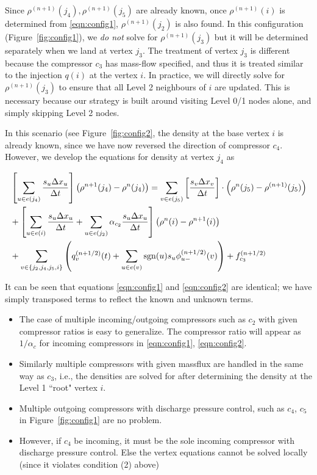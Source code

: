 \documentclass{amsart}
\DeclareMathOperator{\sgn}{sgn}
\begin{document}
Since $\rho^{(n+1)}(j_4), \rho^{(n+1)}(j_5)$ are already known, once $\rho^{(n+1)}(i)$ is determined from \eqref{eqn:config1}, $\rho^{(n+1)}(j_2)$ is also found. 
In this configuration (Figure~\ref{fig:config1}), we \emph{do not} solve for $\rho^{(n+1)}(j_3)$ but it will be determined separately when we land at vertex $j_3$. The treatment of vertex $j_3$ is different because the compressor $c_3$ has mass-flow specified, and thus it is treated similar to the injection $q(i)$  at the vertex $i$. In practice, we will directly solve for $\rho^{(n+1)}(j_3)$ to ensure that all Level 2 neighbours of $i$ are updated. This is necessary because our strategy is built around visiting  Level 0/1 nodes alone, and simply skipping Level 2 nodes.



In this scenario (see Figure~\ref{fig:config2}, the density at the base vertex $i$ is already known, since we have now reversed the direction of compressor $c_4$. However, we develop the equations for density at vertex $j_4$ as 

\begin{align}
& \left[ \sum_{u \in e(j_4)}\frac{s_{u} \Delta x_{u}}{\Delta t} \right] \left ( \rho^{n+1}(j_4) - \rho^{n}(j_4) \right)  = \sum_{v \in e(j_5)}\left[\frac{s_{v} \Delta x_{v}}{\Delta t}\right] \cdot \left(\rho^{n}(j_5) - \rho^{(n+1)}(j_5) \right)  \notag \\
& + \left[ \sum_{u \in e(i)}\frac{s_{u} \Delta x_{u}}{\Delta t} + \sum_{u \in e(j_2)}\alpha_{c_2}\frac{s_{u} \Delta x_{u}}{\Delta t} \right]\left( \rho^n(i) - \rho^{n+1}(i) \right) \notag \\
& +\sum_{v \in \{j_2, j_4, j_5, i\}} \left( q^{(n+1/2)}_{v}(t) + \sum_{u \in e(v)}\sgn(u) s_{u} \phi_{u-}^{(n+1/2)}(v) \right) + f^{(n+1/2)}_{c_3}
\label{eqn:config2}
\end{align}

It can be seen that equations \eqref{eqn:config1} and \eqref{eqn:config2} 
are identical; we have simply transposed terms to reflect the known and unknown terms.

\begin{itemize}
\item The case of multiple incoming/outgoing compressors such as $c_2$ with given compressor ratios is easy to generalize. The compressor ratio will appear as $1/\alpha_c$ for incoming compressors in \eqref{eqn:config1}, \eqref{eqn:config2}. 
\item Similarly multiple compressors with given massflux are handled in the same way as  $c_3$, i.e., the densities are solved for after determining the density at the Level 1 ``root" vertex $i$.
\item Multiple outgoing compressors with discharge pressure control, such as $c_4$, $c_5$ in Figure~\ref{fig:config1} are no problem.
\item However, if $c_4$ be incoming, it must be the sole incoming compressor with discharge pressure control. Else the vertex equations cannot be solved locally (since it violates condition (2) above)
\end{itemize}
\end{document}
